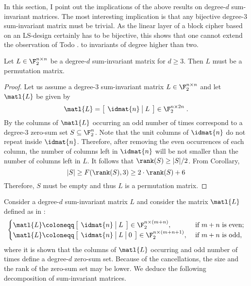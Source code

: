 
In this section, I point out the implications of the above results on degree-$d$ sum-invariant matrices. The most interesting implication is that any bijective degree-$3$ sum-invariant matrix must be trivial. As the linear layer of a block cipher based on an LS-design certainly has to be bijective, this shows that one cannot extend the observation of Todo \etal. to invariants of degree higher than two.

\begin{corollary}
Let $L \in \F_2^{n \times n}$ be a degree-$d$ sum-invariant matrix for $d \geq 3$. Then $L$ must be a permutation matrix.
\end{corollary}
\begin{proof}
Let us assume a degree-$3$ sum-invariant matrix $L \in \F_2^{n \times n}$ and let $\matl{L}$ be given by
\[
\arraycolsep=4pt\def\arraystretch{1}
    \matl{L} = \left[\begin{array}{c|c} \idmat{n} & L\end{array}\right] \in \F_2^{n\times 2n}\;.
\]
By  the columns of $\matl{L}$ occurring an odd number of times correspond to a degree-3 zero-sum set $S \subseteq \F_2^n$. Note that the unit columns of $\idmat{n}$ do not repeat inside $\idmat{n}$. Therefore, after removing the even occurrences of each column, the number of columns left in $\idmat{n}$ will be not smaller than the number of columns left in $L$. It follows that $\rank(S) \ge |S|/2$. From Corollary,
$$
|S|\ge F(\rank(S), 3) \ge 2 \cdot \rank(S) + 6
$$
Therefore, $S$ must be empty and thus $L$ is a permutation matrix.
\end{proof}

Consider a degree-$d$ sum-invariant matrix $L$ and consider the matrix $\matl{L}$ defined as in :
    \begin{equation}
    \begin{cases}
    \arraycolsep=4pt\def\arraystretch{1}
    \matl{L} \coloneqq \left[\begin{array}{c|c} \idmat{n} & L\end{array}\right] \in \F_2^{n\times(m+n)},
    & \text{~if~} m+n \text{~is even}; \\
    \arraycolsep=4pt\def\arraystretch{1}
    \matl{L} \coloneqq \left[\begin{array}{c|c|c} \idmat{n} & L & 0\end{array}\right] \in \F_2^{n\times(m+n+1)},
    & \text{~if~} m+n \text{~is odd},
    \end{cases}
    \end{equation}
where it is shown that the columns of $\matl{L}$ occurring and odd number of times define a degree-$d$ zero-sum set. Because of the cancellations, the size and the rank of the zero-sum set may be lower. We deduce the following decomposition of sum-invariant matrices.

